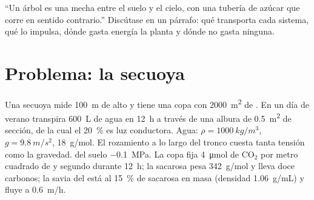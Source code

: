 \begin{exercise}[$\star\star\star$]\label{exo:b1:plant-transport:12}
``Un árbol es una mecha entre el suelo y el cielo, con una tubería de azúcar
que corre en sentido contrario.'' Discútase en un párrafo: qué transporta
cada sistema, qué lo impulsa, dónde gasta energía la planta y dónde no gasta
ninguna.
\end{exercise}

\section{Problema: la secuoya}

\begin{problem}
\label{pb:b1:plant-transport:1}
Una secuoya mide \qty{100}{m} de alto y tiene una copa con \qty{2000}{m^2}
de . En un día de verano transpira \qty{600}{L} de agua en \qty{12}{h} a
través de una albura de \qty{0.5}{m^2} de sección, de la cual el
\qty{20}{\%} es luz conductora. Agua: $\rho = \qty{1000}{kg/m^3}$, $g =
\qty{9.8}{m/s^2}$, \qty{18}{g/mol}. El rozamiento a lo largo del tronco
cuesta tanta tensión como la gravedad.  del suelo
\qty{-0.1}{MPa}. La copa fija \qty{4}{\micro mol} de $\mathrm{CO_2}$ por
metro cuadrado de  y segundo durante \qty{12}{h}; la sacarosa pesa
\qty{342}{g/mol} y lleva doce carbonos; la savia del  está al
\qty{15}{\%} de sacarosa en masa (densidad \qty{1.06}{g/mL}) y fluye a
\qty{0.6}{m/h}.


\end{problem}
